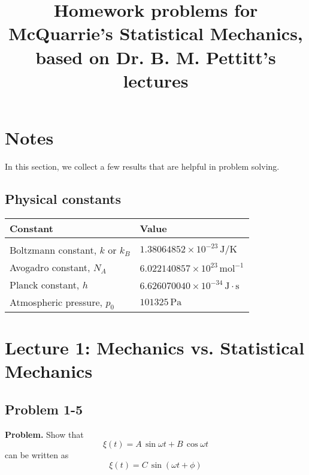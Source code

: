 \documentclass[twocolumn, 10pt]{article}
\numberwithin{equation}{section}
\newenvironment{problem}
{\par\medskip\sffamily \color{problue}
  \textbf{Problem. }\ignorespaces}
{\medskip}
\begin{document}
\title{Homework problems for McQuarrie's Statistical Mechanics, \\
  based on Dr. B. M. Pettitt's lectures}
\author{\vspace{-10ex}}
\date{\vspace{-10ex}}
\maketitle

\tableofcontents

\section*{Notes}

In this section, we collect a few results that are helpful in problem solving.

\subsection{Physical constants}

\begin{table}[h]\centering\small
  \begin{tabular}{l l}
    Constant & Value \\
    \hline \\
    Boltzmann constant, $k$ or $k_B$ &
    $1.38064852\times10^{-23} \, \mathrm{J/K}$
    \\
    Avogadro constant, $N_A$ &
    $6.022140857\times10^{23} \, \mathrm{mol}^{-1}$
    \\
    Planck constant, $h$ &
    $6.626070040\times10^{-34} \, \mathrm{J\cdot s}$
    \\
    Atmospheric pressure, $p_0$ &
    $101325 \, \mathrm{Pa}$
  \end{tabular}
\end{table}


\section{Lecture 1: Mechanics vs. Statistical Mechanics}

\subsection{Problem 1-5}

\begin{problem}
  Show that
  $$\xi(t) = A \, \sin \omega t + B \, \cos \omega t$$
  can be written as
  $$\xi(t) = C \, \sin( \omega t + \phi)$$
\end{problem}
\end{document}

